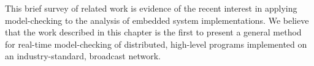 This brief survey of related work is evidence of the recent interest
in applying model-checking to the analysis of embedded system
implementations. We believe that the work described in this chapter is
the first to present a general method for real-time model-checking of
distributed, high-level programs implemented on an industry-standard,
broadcast network.

